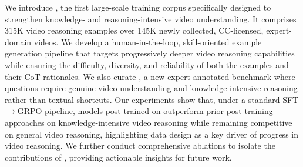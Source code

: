 We introduce \data, the first large-scale training corpus specifically designed to strengthen knowledge- and reasoning-intensive video understanding. It comprises 315K video reasoning examples over 145K newly collected, CC-licensed, expert-domain videos. We develop a human-in-the-loop, skill-oriented example generation pipeline that targets progressively deeper video reasoning capabilities while ensuring the difficulty, diversity, and reliability of both the examples and their CoT rationales.
We also curate \eval, a new expert-annotated benchmark where questions require genuine video understanding and knowledge-intensive reasoning rather than textual shortcuts.
Our experiments show that, under a standard SFT$\rightarrow$GRPO pipeline, models post-trained on \ours outperform prior post-training approaches on knowledge-intensive video reasoning while remaining competitive on general video reasoning, highlighting data design as a key driver of progress in video reasoning.
We further conduct comprehensive ablations to isolate the contributions of \ours, providing actionable insights for future work.

